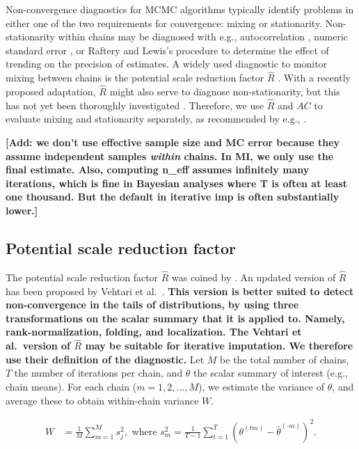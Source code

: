 \documentclass[Royal,times,sageh]{sagej}
\begin{document}
Non-convergence diagnostics for MCMC algorithms typically identify problems in either one of the two requirements for convergence: mixing or stationarity. Non-stationarity within chains may be diagnosed with e.g., autocorrelation \citep[\(AC\);][]{scha97, gelm13}, numeric standard error \citep[`MC error';][]{gewe92}, or Raftery and Lewis's \citeyearpar{raft91} procedure to determine the effect of trending on the precision of estimates. A widely used diagnostic to monitor mixing between chains is the potential scale reduction factor \(\widehat{R}\) \citep[`Gelman-Rubin statistic';][]{gelm92}. With a recently proposed adaptation, \(\widehat{R}\) might also serve to diagnose non-stationarity, but this has not yet been thoroughly investigated \citep{veht19}. Therefore, we use \(\widehat{R}\) and \(AC\) to evaluate mixing and stationarity separately, as recommended by e.g., \citet{cowl96}.

\textbf{{[}Add: we don't use effective sample size and MC error because they assume independent samples \emph{within} chains. In MI, we only use the final estimate. Also, computing n\_eff assumes infinitely many iterations, which is fine in Bayesian analyses where T is often at least one thousand. But the default in iterative imp is often substantially lower.{]}}

\hypertarget{potential-scale-reduction-factor}{%
\subsection{Potential scale reduction factor}\label{potential-scale-reduction-factor}}

The potential scale reduction factor \(\widehat{R}\) was coined by \citet{gelm92}. An updated version of \(\widehat{R}\) has been proposed by Vehtari et al.~\citeyearpar[p.~5]{veht19}. \textbf{This version is better suited to detect non-convergence in the tails of distributions, by using three transformations on the scalar summary that it is applied to. Namely, rank-normalization, folding, and localization. The Vehtari et al.~version of \(\widehat{R}\) may be suitable for iterative imputation. We therefore use their definition of the diagnostic.} Let \(M\) be the total number of chains, \(T\) the number of iterations per chain, and \(\theta\) the scalar summary of interest (e.g., chain means). For each chain (\(m = 1, 2, \dots, M\)), we estimate the variance of \(\theta\), and average these to obtain within-chain variance \(W\).

\begin{align*}
W&=\frac{1}{M} \sum_{m=1}^{M} s_{j}^{2}, \text { where } s_{m}^{2}=\frac{1}{T-1} \sum_{t=1}^{T}\left(\theta^{(t m)}-\bar{\theta}^{(\cdot m)}\right)^{2}. 
\end{align*}
\end{document}
